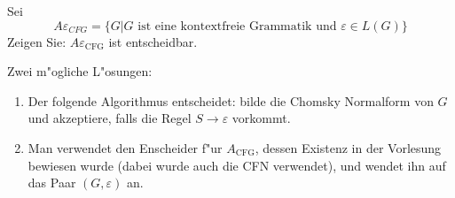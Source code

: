Sei
\[
A\varepsilon_{CFG}=\{
G|\text{$G$ ist eine kontextfreie Grammatik und $\varepsilon\in L(G)$}
\}
\]
Zeigen Sie: $A\varepsilon_{\text{CFG}}$ ist entscheidbar.

\begin{loesung}
Zwei m"ogliche L"osungen:
\begin{enumerate}
\item
Der folgende Algorithmus entscheidet: bilde die Chomsky Normalform von $G$
und akzeptiere, falls die Regel $S\to\varepsilon$ vorkommt.
\item
Man verwendet den Enscheider f"ur $A_{\text{CFG}}$, dessen
Existenz in der Vorlesung bewiesen wurde (dabei wurde auch die CFN
verwendet), und wendet ihn auf das Paar $(G,\varepsilon)$ an.
\end{enumerate}
\end{loesung}
